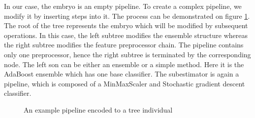 In our case, the embryo is an empty pipeline. To create a complex pipeline, we
modify it by inserting steps into it. The process can be demonstrated on figure
\ref{pic:pipeencoding}. The root of the tree represents the embryo which will
be modified by subsequent operations. In this case, the left subtree modifies
the ensemble structure whereas the right subtree modifies the feature
preprocessor chain. The pipeline contains only one preprocessor, hence the
right subtree is terminated by the corresponding node. The left son can be
either an ensemble or a simple method. Here it is the AdaBoost ensemble which
has one base classifier. The subestimator is again a pipeline, which is composed
of a MinMaxScaler and Stochastic gradient descent classifier.

\begin{figure}[h]\centering
    \qquad
    \caption{An example pipeline encoded to a tree individual}%
    \label{pic:pipeencoding}%
\end{figure}


